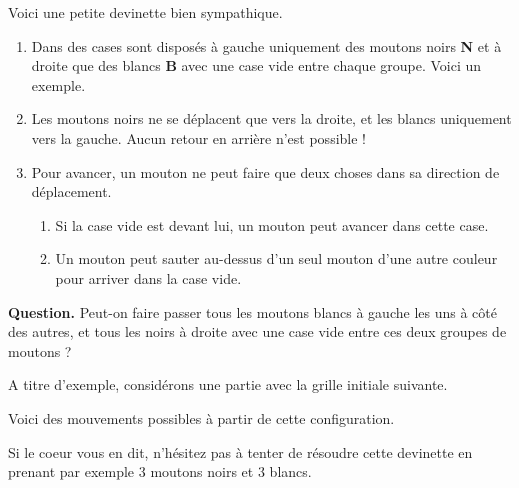 Voici une petite devinette bien sympathique.

\begin{enumerate}
    \item Dans des cases sont disposés à gauche uniquement des moutons noirs \textbf{N} et à droite que des blancs \textbf{B} avec une case vide entre chaque groupe. Voici un exemple.


    \item Les moutons noirs ne se déplacent que vers la droite, et les blancs uniquement vers la gauche. Aucun retour en arrière n'est possible !


    \item Pour avancer, un mouton ne peut faire que deux choses dans sa direction de déplacement.
    \begin{enumerate}
        \item Si la case vide est devant lui, un mouton peut avancer dans cette case.

        \item Un mouton peut sauter au-dessus d'un seul mouton d'une autre couleur pour arriver dans la case vide.
    \end{enumerate}
\end{enumerate}

\textbf{Question.} Peut-on faire passer tous les moutons blancs à gauche les uns à côté des autres, et tous les noirs à droite avec une case vide entre ces deux groupes de moutons ?


\bigskip


A titre d'exemple, considérons une partie avec la grille initiale suivante.


Voici des mouvements possibles à partir de cette configuration.

\medskip

\begin{mvts}
    \item {}

    \medskip
    \item {}

    \medskip
    \item {}

    \medskip
    \item {}

    \medskip
    \item {}

    \medskip
    \item {}
\end{mvts}

Si le coeur vous en dit, n'hésitez pas à tenter de résoudre cette devinette en prenant par exemple $3$ moutons noirs et $3$ blancs.
